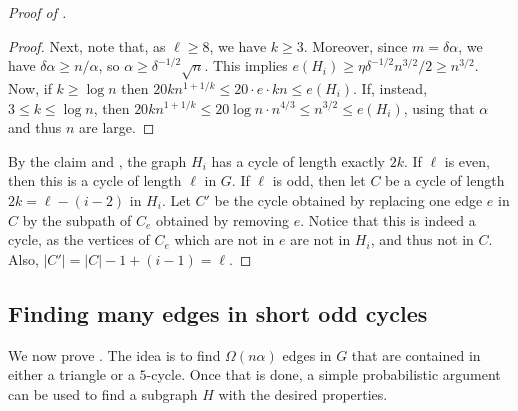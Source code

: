 \documentclass[11pt,english]{article}
\theoremstyle{plain}
\theoremstyle{definition}
\theoremstyle{remark}
\begin{document}
\begin{proof}[Proof of ]
\begin{proof}
				Next, note that, as $\ell \ge 8$, we have $k \ge 3$.
				Moreover, since $m = \delta \alpha$, we have $\delta \alpha \ge n / \alpha$, so $\alpha \ge \delta^{-1/2}\sqrt{n}$. This implies $e(H_i) \ge \eta \delta^{-1/2} n^{3/2}/2 \ge n^{3/2}$. 
				Now, if $k \ge \log n$ then $20kn^{1 + 1/k} \le 20 \cdot e \cdot kn \le e(H_i)$. If, instead, $3 \le k \le \log n$, then $20kn^{1 + 1/k} \le 20 \log n \cdot n^{4/3} \le n^{3/2} \le e(H_i)$, using that $\alpha$ and thus $n$ are large.
			\end{proof}

			By the claim and , the graph $H_i$ has a cycle of length exactly $2k$. If $\ell$ is even, then this is a cycle of length $\ell$ in $G$. If $\ell$ is odd, then let $C$ be a cycle of length $2k = \ell - (i-2)$ in $H_i$. Let $C'$ be the cycle obtained by replacing one edge $e$ in $C$ by the subpath of $C_e$ obtained by removing $e$. Notice that this is indeed a cycle, as the vertices of $C_e$ which are not in $e$ are not in $H_i$, and thus not in $C$. Also, $|C'| = |C| - 1 + (i-1) = \ell$.
		\end{proof}

	\subsection{Finding many edges in short odd cycles}
		We now prove .
		The idea is to find $\Omega(n\alpha)$ edges in $G$ that are contained in either a triangle or a $5$-cycle. 
		Once that is done, a simple probabilistic argument can be used to find a subgraph $H$ with the desired properties.
\end{document}
